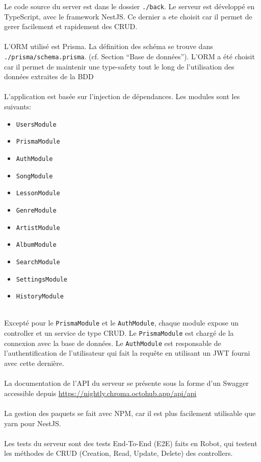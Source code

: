 Le code source du server est dans le dossier \texttt{./back}. Le serveur est développé en TypeScript, avec le framework NestJS. Ce dernier a ete choisit car il permet de gerer facilement et rapidement des CRUD.
\\\\
L’ORM utilisé est Prisma. La définition des schéma se trouve dans \texttt{./prisma/schema.prisma}. (cf. Section “Base de données”). L'ORM a été choisit car il permet de maintenir une type-safety tout le long de l'utilisation des données extraites de la BDD
\\\\
L’application est basée sur l'injection de dépendances. Les modules sont les suivants:

\begin{itemize}
	\item \texttt{UsersModule}
	\item \texttt{PrismaModule}
	\item \texttt{AuthModule}
	\item \texttt{SongModule}
	\item \texttt{LessonModule}
	\item \texttt{GenreModule}
	\item \texttt{ArtistModule}
	\item \texttt{AlbumModule}
	\item \texttt{SearchModule}
	\item \texttt{SettingsModule}
	\item \texttt{HistoryModule}
\end{itemize}
\  \\ %
Excepté pour le \texttt{PrismaModule} et le \texttt{AuthModule}, chaque module expose un controller et un service de type CRUD.
Le \texttt{PrismaModule} est chargé de la connexion avec la base de données. Le \texttt{AuthModule} est responsable de l'authentification de l’utilisateur qui fait la requête en utilisant un JWT fourni avec cette dernière.
\\\\
La documentation de l’API du serveur se présente sous la forme d’un Swagger accessible depuis \url{https://nightly.chroma.octohub.app/api/api}
\\\\
La gestion des paquets se fait avec NPM, car il est plus facilement utilisable que yarn pour NestJS.
\\\\
Les tests du serveur sont des tests End-To-End (E2E) faits en Robot, qui testent les méthodes de CRUD (Creation, Read, Update, Delete) des controllers. 
